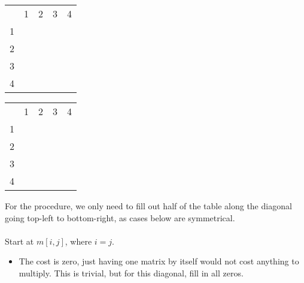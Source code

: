 \documentclass[12pt]{article}
\begin{document}
\newpage

\begin{center}
\label*{$m$}
\begin{tabular}{ c|c|c|c|c| }
    \multicolumn{1}{c}{}
    & \multicolumn{1}{c}{1}
    & \multicolumn{1}{c}{2}
    & \multicolumn{1}{c}{3}
    & \multicolumn{1}{c}{4}\\

    \cline{2-5}
        1 &  &  &  &  \\
    \cline{2-5}
        2 &  &  &  &  \\
    \cline{2-5}
        3 &  &  &  &  \\
    \cline{2-5}
        4 &  &  &  &  \\
    \cline{2-5}
\end{tabular}
\end{center}

\begin{center}
\label*{$s$}
\begin{tabular}{ c|c|c|c|c| }
    \multicolumn{1}{c}{}
    & \multicolumn{1}{c}{1}
    & \multicolumn{1}{c}{2}
    & \multicolumn{1}{c}{3}
    & \multicolumn{1}{c}{4}\\

    \cline{2-5}
        1 &  &  &  &  \\
    \cline{2-5}
        2 &  &  &  &  \\
    \cline{2-5}
        3 &  &  &  &  \\
    \cline{2-5}
        4 &  &  &  &  \\
    \cline{2-5}
\end{tabular}
\end{center}

For the procedure, we only need to fill out half of the table along the diagonal going top-left to bottom-right, as cases below are symmetrical.
\\ \\
Start at $m[i, j]$, where $i=j$.
\begin{itemize}
    \item The cost is zero, just having one matrix by itself would not cost anything to multiply. This is trivial, but for this diagonal, fill in all zeros.
\end{itemize}
\end{document}
